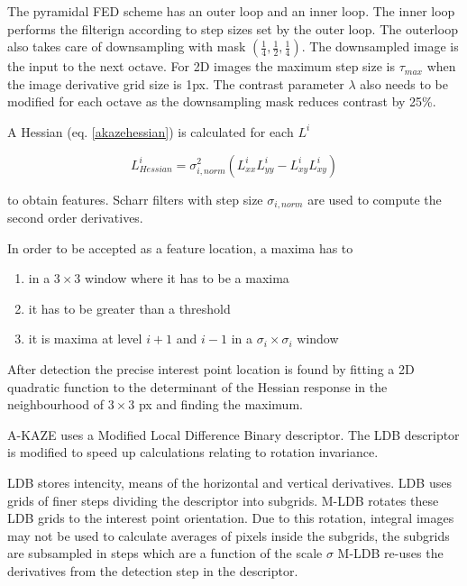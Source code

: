 \documentclass[english,12pt,a4paper,pdftex,elec,utf8]{aaltothesis}
\begin{document}
The pyramidal FED scheme has an outer loop and an inner loop. The inner loop performs the filterign according to step sizes set by the outer loop. The outerloop also takes care of downsampling with mask $(\frac{1}{4}, \frac{1}{2}, \frac{1}{4})$. The downsampled image is the input to the next octave. For 2D images the maximum step size is $\tau_{max}$ when the image derivative grid size is 1px. The contrast parameter $\lambda$ also needs to be modified for each octave as the downsampling mask reduces contrast by 25\%.

A Hessian (eq. \ref{akazehessian}) is calculated for each $L^i$

\begin{equation}
  \label{akazehessian}
L^i_{Hessian} = \sigma^2_{i,norm}(L^i_{xx}L^i_{yy}-L^i_{xy}L^i_{xy})
\end{equation}

to obtain features. Scharr filters with step size $\sigma_{i,norm}$ are used to compute the second order derivatives.

In order to be accepted as a feature location, a maxima has to

\begin{enumerate}
\item in a $3 \times 3$ window where it has to be a maxima
\item it has to be greater than a threshold
\item it is maxima at level $i+1$ and $i-1$ in a $\sigma_i\times\sigma_i$ window
\end{enumerate}

After detection the precise interest point location is found by fitting a 2D quadratic function to the determinant of the Hessian response in the neighbourhood of $3 \times 3$ px and finding the maximum.

A-KAZE uses a Modified Local Difference Binary descriptor. The LDB descriptor is modified to speed up calculations relating to rotation invariance.

LDB stores intencity, means of the horizontal and vertical derivatives. LDB uses grids of finer steps dividing the descriptor into subgrids. M-LDB rotates these LDB grids to the interest point orientation. Due to this rotation, integral images may not be used to calculate averages of pixels inside the subgrids, the subgrids are subsampled in steps which are a function of the scale $\sigma$ M-LDB re-uses the derivatives from the detection step in the descriptor.


\end{document}
